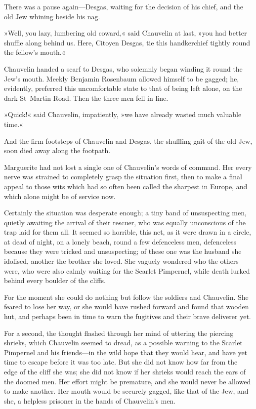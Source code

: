 There was a pause again—Desgas, waiting for the decision of his chief, and the old Jew whining beside his nag.

»Well, you lazy, lumbering old coward,« said Chauvelin at last, »you had better shuffle along behind us. Here, Citoyen Desgas, tie this handkerchief tightly round the fellow's mouth.«

Chauvelin handed a scarf to Desgas, who solemnly began winding it round the Jew's mouth. Meekly Benjamin Rosenbaum allowed himself to be gagged; he, evidently, preferred this uncomfortable state to that of being left alone, on the dark St~Martin Road. Then the three men fell in line.

»Quick!« said Chauvelin, impatiently, »we have already wasted much valuable time.«

And the firm footsteps of Chauvelin and Desgas, the shuffling gait of the old Jew, soon died away along the footpath.

Marguerite had not lost a single one of Chauvelin's words of command. Her every nerve was strained to completely grasp the situation first, then to make a final appeal to those wits which had so often been called the sharpest in Europe, and which alone might be of service now.

Certainly the situation was desperate enough; a tiny band of unsuspecting men, quietly awaiting the arrival of their rescuer, who was equally unconscious of the trap laid for them all. It seemed so horrible, this net, as it were drawn in a circle, at dead of night, on a lonely beach, round a few defenceless men, defenceless because they were tricked and unsuspecting; of these one was the husband she idolised, another the brother she loved. She vaguely wondered who the others were, who were also calmly waiting for the Scarlet Pimpernel, while death lurked behind every boulder of the cliffs.

For the moment she could do nothing but follow the soldiers and Chauvelin. She feared to lose her way, or she would have rushed forward and found that wooden hut, and perhaps been in time to warn the fugitives and their brave deliverer yet.

For a second, the thought flashed through her mind of uttering the piercing shrieks, which Chauvelin seemed to dread, as a possible warning to the Scarlet Pimpernel and his friends—in the wild hope that they would hear, and have yet time to escape before it was too late. But she did not know how far from the edge of the cliff she was; she did not know if her shrieks would reach the ears of the doomed men. Her effort might be premature, and she would never be allowed to make another. Her mouth would be securely gagged, like that of the Jew, and she, a helpless prisoner in the hands of Chauvelin's men.

